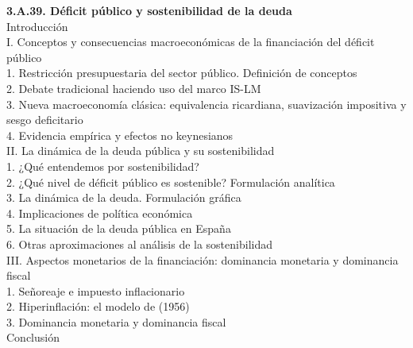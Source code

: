 \documentclass[11pt]{article}
\begin{document}
\begin{esquema}[unbreakable]
\textbf{3.A.39. Déficit público y sostenibilidad de la deuda}\\[2pt]
Introducción\\
I. Conceptos y consecuencias macroeconómicas de la financiación del déficit público\\
\hspace*{1.5em}1. Restricción presupuestaria del sector público. Definición de conceptos\\
\hspace*{1.5em}2. Debate tradicional haciendo uso del marco IS-LM\\
\hspace*{1.5em}3. Nueva macroeconomía clásica: equivalencia ricardiana, suavización impositiva y sesgo deficitario\\
\hspace*{1.5em}4. Evidencia empírica y efectos no keynesianos\\
II. La dinámica de la deuda pública y su sostenibilidad\\
\hspace*{1.5em}1. ¿Qué entendemos por sostenibilidad?\\
\hspace*{1.5em}2. ¿Qué nivel de déficit público es sostenible? Formulación analítica\\
\hspace*{1.5em}3. La dinámica de la deuda. Formulación gráfica\\
\hspace*{1.5em}4. Implicaciones de política económica\\
\hspace*{1.5em}5. La situación de la deuda pública en España\\
\hspace*{1.5em}6. Otras aproximaciones al análisis de la sostenibilidad\\
III. Aspectos monetarios de la financiación: dominancia monetaria y dominancia fiscal\\
\hspace*{1.5em}1. Señoreaje e impuesto inflacionario\\
\hspace*{1.5em}2. Hiperinflación: el modelo de  (1956)\\
\hspace*{1.5em}3. Dominancia monetaria y dominancia fiscal\\
Conclusión
\end{esquema}
\end{document}
